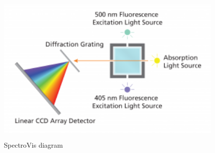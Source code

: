 \begin{figure}
\begin{centering}
\includegraphics[width=4.4862in,height=2.972in]{../images/SpectroVisDiagram.png} 
\caption{SpectroVis diagram}
\label{fig:spectrovisdiagram}
\end{centering}
\end{figure}







